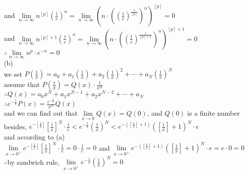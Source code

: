 \documentclass{article}
\begin{document}
\qquad\quad and $\displaystyle\lim \limits_{n \to \infty}n^{[p]}\left(\frac{1}{e}\right)^n=\lim \limits_{n \to \infty}\left(n\cdot\left(\left(\frac{1}{e}\right)^{\frac{1}{[p]}}\right)^n\right)^{[p]}=0$\\

\qquad\quad and $\displaystyle\lim \limits_{n \to \infty}n^{[p]+1}\left(\frac{1}{e}\right)^n=\lim \limits_{n \to \infty}\left(n\cdot\left(\left(\frac{1}{e}\right)^{\frac{1}{[p]+1}}\right)^n\right)^{[p]+1}=0$\\

$\therefore$\qquad$\lim \limits_{n \to \infty}n^p\cdot e^{-n}=0$\\

(b)\\

we set $\displaystyle P\left(\frac{1}{x}\right)=a_0+a_1\left(\frac{1}{x}\right)+a_2\left(\frac{1}{x}\right)^2+\cdots+a_N\left(\frac{1}{x}\right)^N$\\

assume that $\displaystyle P(\frac{1}{x})=Q(x)\cdot\frac{1}{x^N}$\\

$\therefore$\qquad$Q(x)=a_0x^N+a_1x^{N-1}+a_2x^{N-2}+\cdots+a_N$\\

$\therefore$\qquad$\displaystyle e^{-\frac{1}{x}}P(x)=\frac{e^{-\frac{1}{x}}}{x^N}Q(x)$\\

and we can find out that $\lim \limits_{x \to 0}Q(x)=Q(0)$, and $Q(0)$ is a finite number\\

besides, $\displaystyle e^{-\left[\frac{1}{x}\right]}\left[\frac{1}{x}\right]^N\cdot\frac{1}{e}<e^{-\frac{1}{x}}\left(\frac{1}{x}\right)^N<e^{-\left(\left[\frac{1}{x}\right]+1\right)}\left(\left[\frac{1}{x}\right]+1\right)^N\cdot e$\\

and according to (a)\\

$\lim \limits_{x \to 0^+}e^{-\left[\frac{1}{x}\right]}\left[\frac{1}{x}\right]^N\cdot\frac{1}{e}=0\cdot\frac{1}{e}=0$ and $\lim \limits_{x \to 0^+}e^{-\left(\left[\frac{1}{x}\right]+1\right)}\left(\left[\frac{1}{x}\right]+1\right)^N\cdot e=e\cdot0=0$\\

$\therefore$\qquad by sandwich rule, $\lim \limits_{x \to 0^+}e^{-\frac{1}{x}}\left(\frac{1}{x}\right)^N=0$\\
\end{document}
